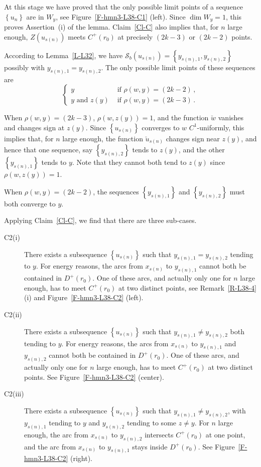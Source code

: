 \documentclass[12pt,a4paper]{amsart}
\theoremstyle{plain} %
\theoremstyle{definition}
\numberwithin{equation}{section}
\numberwithin{figure}{section}
\numberwithin{table}{section}
\newcommand{\cS}{\mathcal{S}}
\newcommand{\set}[1]{\left\lbrace #1 \right\rbrace}
\begin{document}
 At this stage we have proved that the only possible limit points of a sequence $\set{u_n}$ are in $W_y$,  see Figure~\ref{F-hmn3-L38-C1} (left).  Since $\dim W_y = 1$, this proves Assertion~(i) of the lemma. Claim~\ref{Cl-C} also implies that, for $n$ large enough, $Z(u_{s(n)})$ meets $C^{+}(r_0)$ at precisely $(2k-3)$ or $(2k-2)$ points. \medskip

According to  Lemma~\ref{L-L32}, we have $\cS_b(u_{s(n)}) = \set{y_{s(n),1},y_{s(n),2}}$ possibly with $y_{s(n),1} = y_{s(n),2}$. The only possible limit points of these sequences are
%
\begin{equation*}
\left\{
  \begin{array}{ll}
    y & \text{~if~} \rho(w,y) = (2k-2)\,,\\[5pt]
    y\text{~and~} z(y) & \text{~if~} \rho(w,y) = (2k-3)\,.
  \end{array}
\right.
\end{equation*}


When $\rho(w,y) = (2k-3)$, $\rho(w,z(y))=1$, and the function $\breve{w}$ vanishes and changes sign at $z(y)$. Since $\set{u_{s(n)}}$ converges to $w$ $C^{1}$-uniformly, this implies that, for $n$ large enough, the function $\breve{u}_{s(n)}$ changes sign near $z(y)$, and hence that one sequence, say $\set{y_{s(n),2}}$ tends to $z(y)$, and the other $\set{y_{s(n),1}}$ tends to $y$. Note that they cannot both tend to $z(y)$ since $\rho (w,z(y))=1$.\smallskip

When $\rho(w,y) = (2k-2)$, the sequences $\set{y_{s(n),1}}$ and $\set{y_{s(n),2}}$ must both converge to $y$.\smallskip

Applying Claim~\ref{Cl-C}, we find that there are three sub-cases.
\begin{description}
  \item[C2(i)] There exists a subsequence $\set{u_{s(n)}}$ such that $y_{s(n),1} = y_{s(n),2}$ tending to $y$. For energy reasons, the arcs from $x_{s(n)}$ to $y_{s(n),1}$ cannot both be contained in $D^{+}(r_0)$. One of these arcs, and actually only one for $n$ large enough, has to meet $C^{+}(r_0)$ at two distinct points,  see Remark~\ref{R-L38-4}(i)  and Figure~\ref{F-hmn3-L38-C2} (left).
  \item[C2(ii)] There exists a subsequence $\set{u_{s(n)}}$ such that $y_{s(n),1} \not = y_{s(n),2}$ both tending to $y$. For energy reasons, the arcs from $x_{s(n)}$ to $y_{s(n),1}$ and $y_{s(n),2}$ cannot both be contained in $D^{+}(r_0)$. One of these arcs, and actually only one for $n$ large enough, has to meet $C^{+}(r_0)$ at two distinct points.  See Figure~\ref{F-hmn3-L38-C2} (center).
  \item[C2(iii)] There exists a subsequence $\set{u_{s(n)}}$ such that $y_{s(n),1} \not = y_{s(n),2}$, with  $y_{s(n),1}$ tending to $y$ and $y_{s(n),2}$ tending to some $z \not = y$. For $n$ large enough, the arc from $x_{s(n)}$ to $y_{s(n),2}$ intersects  $C^{+}(r_0)$ at one point, and the arc from $x_{s(n)}$ to $y_{s(n),1}$ stays inside $D^{+}(r_0)$.  See Figure~\ref{F-hmn3-L38-C2} (right).
\end{description}
\end{document}
